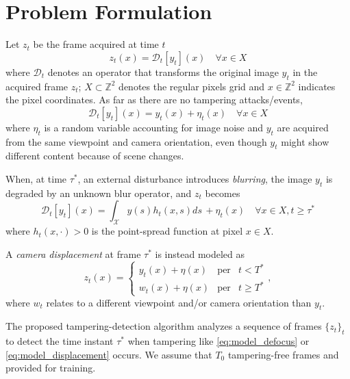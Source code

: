 \documentclass{llncs}
\begin{document}
\section{Problem Formulation}\label{sec:probForm}
%
Let $z_t$ be the frame acquired at time $t$
\begin{equation}
\label{eq:observationModel}
z_t(x)=\mathcal{D}_t[y_t](x) \quad \forall x \in X
\end{equation}
where $\mathcal{D}_t$ denotes an operator that transforms the original image $y_t$ in the acquired frame $z_t$; $X \subset \mathbb{Z}^2$ denotes the regular pixels grid and $x\in \mathbb{Z}^2$ indicates the pixel coordinates. As far as there are no tampering attacks/events,
\begin{equation}
\label{eq:no_tampering}
\mathcal{D}_t[y_t](x) = y_t(x) + \eta_t(x) \quad \forall x \in X
\end{equation}
where $\eta_t$ is a random variable accounting for image noise and $y_t$ are acquired from the same viewpoint and camera orientation, even though $y_t$ might show different content because of scene changes.

When, at time $\tau^*$, an external disturbance introduces \emph{blurring}, the image $y_t$ is degraded by an unknown blur operator, and $z_t$ becomes
\begin{equation}
\label{eq:model_defocus}
\mathcal{D}_t[y_t](x) = \int_{\mathcal{X}}y(s)h_t(x,s)ds\, + \eta_t(x) \quad \forall x \in X, t \geq \tau^*
\end{equation}
where $h_t(x,\cdot) > 0$ is the point-spread function at pixel $x \in X$.

A \emph{camera displacement} at frame $\tau^*$ is instead modeled as 
\begin{equation}
\label{eq:model_displacement}
z_t(x)  = \left\{ \begin{array}{rcl}
y_t(x) + \eta(x) & \mbox{per} & t < T^* \\
w_t(x) + \eta(x) & \mbox{per} & t \geqslant T^*
\end{array}\right. ,
\end{equation}
where $w_t$ relates to a different viewpoint and/or camera orientation than $y_t$. 

The proposed tampering-detection algorithm analyzes a sequence of frames $\{z_t\}_t$ to detect the time instant $\tau^*$ when tampering like \eqref{eq:model_defocus} or \eqref{eq:model_displacement} occurs. We assume that $T_0$ tampering-free frames and provided for training.
\end{document}
